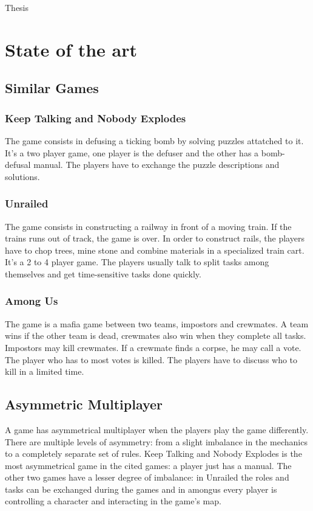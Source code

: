 \documentclass{article}
\begin{document}
\setlength{\parindent}{0in}

\begin {center}
\large Thesis
\end{center}

\tableofcontents

\section{State of the art}
\subsection{Similar Games}
\subsubsection{Keep Talking and Nobody Explodes}
The game consists in defusing a ticking bomb by solving puzzles attatched to it. It's a two player game, one player is the defuser and the other has a bomb-defusal manual. The players have to exchange the puzzle descriptions and solutions. 
\subsubsection{Unrailed}
The game consists in constructing a railway in front of a moving train. If the trains runs out of track, the game is over. In order to construct rails, the players have to chop trees, mine stone and combine materials in a specialized train cart. It's a 2 to 4 player game. The players  usually talk to split tasks among themselves and get time-sensitive tasks done quickly.
\subsubsection{Among Us}
The game is a mafia game between two teams, impostors and crewmates. A team wins if the other team is dead, crewmates also win when they complete all tasks. Impostors may kill crewmates. If a crewmate finds a corpse, he may call a vote. The player who has to most votes is killed. The players have to discuss who to kill in a limited time.
\subsection{Asymmetric Multiplayer}
A game has asymmetrical multiplayer when the players play the game differently. There are multiple levels of asymmetry: from a slight imbalance in the mechanics to a completely separate set of rules. Keep Talking and Nobody Explodes is the most asymmetrical game in the cited games: a player just has a manual. The other two games have a lesser degree of imbalance: in Unrailed the roles and tasks can be exchanged during the games and in amongus every player is controlling a character and interacting in the game's map.
\end{document}
